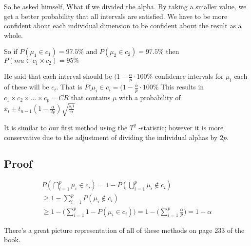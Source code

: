  So he asked himself, What if we divided the alpha. By taking a smaller value, we get a better probability that all intervals are satisfied. We have to be more confident about each individual dimension to be confident about the result as a whole.
 
 So if $P(\mu_1 \in c_1) = 97.5\%$ and $P(\mu_2 \in c_2) = 97.5\%$ then $P(mu \in c_1 \times c_2) = 95\%$
 
 He said that each interval should be $(1-\frac{\alpha}{p}\cdot 100\%$ confidence intervals for $\mu_i$ each of these will be $c_i$. That is $P(\mu_i \in c_i =(1-\frac{\alpha}{p}\cdot 100\%$ This results in $c_1 \times c_2 \times ... \times c_p =CR$ that contains $\mu$ with a probability of $\overline{x}_i \pm t_{n-1}(1-\frac{\alpha}{2p})\sqrt{\frac{s_ii}{n}}$
 
 It is similar to our first method using the $T^2$ -statistic; however it is more conservative due to the adjustment of dividing the individual alphas by $2p$.
 
 \subsection*{Proof}
\begin{gather*}
    P(\bigcap_{i=1}^{p}\mu_i \in c_i) = 1 - P(\bigcup_{i=1}^{p}\mu_i \not\in c_i) \\
    \geq 1- \sum_{i=1}^p P(\mu_i \not\in c_i) \\
    \geq 1- \Big( \sum_{i=1}^p 1- P(\mu_i \in c_i) \Big) =1-\Big( \sum_{i=1}^p \frac{\alpha}{p}\Big) = 1-\alpha
\end{gather*}

There's a great picture representation of all of these methods on page 233 of the book.